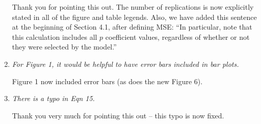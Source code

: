 \documentclass{article}
\begin{document}
\begin{enumerate}
  Thank you for pointing this out.  The number of replications is now explicitly stated in all of the figure and table legends.  Also, we have added this sentence at the beginning of Section 4.1, after defining MSE: ``In particular, note that this calculation includes all $p$ coefficient values, regardless of whether or not they were selected by the model.''

\item \emph{For Figure 1, it would be helpful to have error bars included in bar plots.}

  Figure 1 now included error bars (as does the new Figure 6).

\item \emph{There is a typo in Eqn 15.}

  Thank you very much for pointing this out -- this typo is now fixed.

\end{enumerate}

%
%
\end{document}
